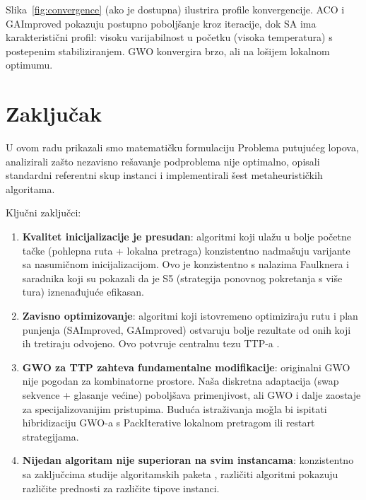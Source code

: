 \documentclass[12pt,a4paper]{article}
\begin{document}
Slika~\ref{fig:convergence} (ako je dostupna) ilustrira profile konvergencije. ACO i GAImproved pokazuju postupno pobolj\v{s}anje kroz iteracije, dok SA ima karakteristi\v{c}ni profil: visoku varijabilnost u po\v{c}etku (visoka temperatura) s postepenim stabiliziranjem. GWO konvergira brzo, ali na lo\v{s}ijem lokalnom optimumu.

\section{Zaklju\v{c}ak}

U ovom radu prikazali smo matematičku formulaciju Problema putuju\'{c}eg lopova, analizirali zašto nezavisno re\v{s}avanje podproblema nije optimalno, opisali standardni referentni skup instanci i implementirali \v{s}est metaheuristi\v{c}kih algoritama.

Klju\v{c}ni zaklju\v{c}ci:
\begin{enumerate}
    \item \textbf{Kvalitet inicijalizacije je presudan}: algoritmi koji ulažu u bolje po\v{c}etne ta\v{c}ke (pohlepna ruta + lokalna pretraga) konzistentno nadma\v{s}uju varijante sa nasumi\v{c}nom inicijalizacijom. Ovo je konzistentno s nalazima Faulknera i saradnika \cite{faulkner2015} koji su pokazali da je S5 (strategija ponovnog pokretanja s vi\v{s}e tura) iznenađuju\'{c}e efikasan.
    \item \textbf{Zavisno optimizovanje}: algoritmi koji istovremeno optimiziraju rutu i plan punjenja (SAImproved, GAImproved) ostvaruju bolje rezultate od onih koji ih tretiraju odvojeno. Ovo potvr\dj{}uje centralnu tezu TTP-a \cite{bonyadi2013,mei2014}.
    \item \textbf{GWO za TTP zahteva fundamentalne modifikacije}: originalni GWO nije pogodan za kombinatorne prostore. Na\v{s}a diskretna adaptacija (swap sekvence + glasanje ve\'{c}ine) poboljšava primenjivost, ali GWO i dalje zaostaje za specijalizovanijim pristupima. Budu\'{c}a istra\v{z}ivanja mo\v{g}la bi ispitati hibridizaciju GWO-a s PackIterative lokalnom pretragom ili restart strategijama.
    \item \textbf{Nijedan algoritam nije superioran na svim instancama}: konzistentno sa zaklju\v{c}cima studije algoritamskih paketa \cite{wagner_selection}, razli\v{c}iti algoritmi pokazuju razli\v{c}ite prednosti za razli\v{c}ite tipove instanci.
\end{enumerate}
\end{document}
